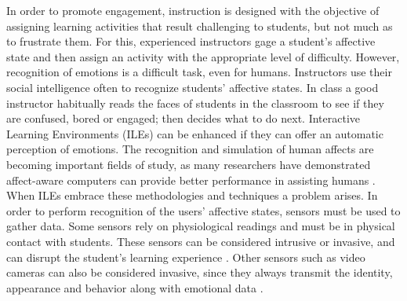 \documentclass[a4paper]{llncs}
\begin{document}
In order to promote engagement, instruction is designed with the
objective of assigning learning activities
that result challenging to students, but not much as to frustrate them. For
this, experienced instructors gage a student’s affective state and then assign
an activity with the appropriate level of difficulty. However, recognition of 
emotions is a difficult task, even
for humans. Instructors use their social intelligence often to recognize
students’ affective states. In class a good instructor habitually reads the
faces of students in the classroom to see if they are confused, bored or
engaged; then decides what to do next. Interactive Learning Environments (ILEs)
can be enhanced if they can offer an
automatic perception of emotions. The recognition and simulation of human
affects are becoming important fields of study, as many researchers have
demonstrated affect-aware computers can provide better performance in assisting
humans \cite{picard2001toward}. When ILEs embrace these methodologies and techniques a
problem arises. In order to perform recognition of the users' affective states,
sensors must be used to gather data. Some sensors rely on physiological readings
and must be in physical contact with students. These sensors can be considered
intrusive or invasive, and can disrupt the student’s learning experience 
\cite{zhai2008stress,sidney2005integrating,arroyo2009emotion}.
Other sensors such as video cameras can also be considered invasive, since they always transmit the
identity, appearance and behavior along with emotional data \cite{picard2001toward}.
\end{document}
